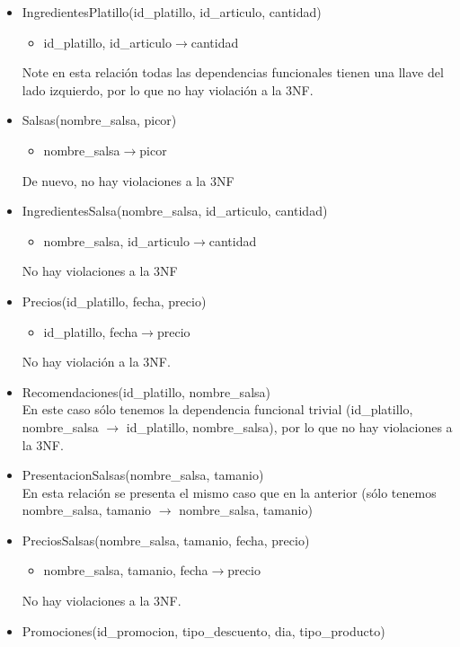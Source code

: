 \documentclass[11pt]{article}
\begin{document}
\begin{itemize}
\item IngredientesPlatillo(id\_platillo, id\_articulo, cantidad)
      \begin{itemize}
        \item id\_platillo, id\_articulo$\rightarrow$cantidad
      \end{itemize}
      Note en esta relación todas las dependencias funcionales tienen una llave del lado izquierdo, por lo que no hay violación a la 3NF. 
\item Salsas(nombre\_salsa, picor)
      \begin{itemize}
        \item nombre\_salsa$\rightarrow$picor
      \end{itemize}
      De nuevo, no hay violaciones a la 3NF
\item IngredientesSalsa(nombre\_salsa, id\_articulo, cantidad)
      \begin{itemize}
        \item nombre\_salsa, id\_articulo$\rightarrow$cantidad
      \end{itemize}
      No hay violaciones a la 3NF
\item Precios(id\_platillo, fecha, precio)
      \begin{itemize}
        \item id\_platillo, fecha$\rightarrow$precio
      \end{itemize}
      No hay violación a la 3NF. 
\item Recomendaciones(id\_platillo, nombre\_salsa)
      \\En este caso sólo tenemos la dependencia funcional trivial (id\_platillo, nombre\_salsa $\rightarrow$ id\_platillo, nombre\_salsa), por lo que no hay violaciones a la 3NF.
\item PresentacionSalsas(nombre\_salsa, tamanio)
      \\En esta relación se presenta el mismo caso que en la anterior (sólo tenemos nombre\_salsa, tamanio $\rightarrow$ nombre\_salsa, tamanio)
\item PreciosSalsas(nombre\_salsa, tamanio, fecha, precio)
      \begin{itemize}
        \item nombre\_salsa, tamanio, fecha$\rightarrow$precio
      \end{itemize}
      No hay violaciones a la 3NF.
\item Promociones(id\_promocion, tipo\_descuento, dia, tipo\_producto)
      \begin{itemize}

\end{itemize}
\end{itemize}
\end{document}
